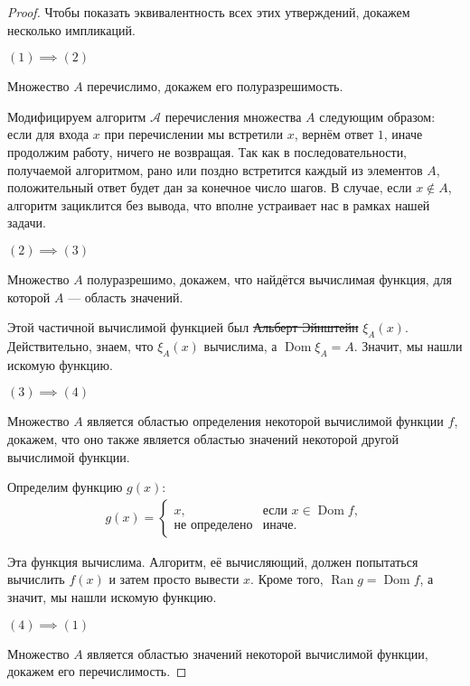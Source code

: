 \documentclass{article}
\begin{document}
    \begin{proof}
        Чтобы показать эквивалентность всех этих утверждений, докажем несколько импликаций.

        $(1) \implies (2)$

        Множество $A$ перечислимо, докажем его полуразрешимость.

        Модифицируем алгоритм $\mathcal{A}$ перечисления множества $A$ следующим образом: если для входа $x$
        при перечислении мы встретили $x$, вернём ответ $1$, иначе продолжим работу, ничего не возвращая.
        Так как в последовательности, получаемой алгоритмом, рано или поздно встретится каждый из
        элементов $A$, положительный ответ будет дан за конечное число шагов. В случае, если $x
        \not\in A$, алгоритм зациклится без вывода, что вполне устраивает нас в рамках нашей задачи.

        $(2) \implies (3)$

        Множество $A$ полуразрешимо, докажем, что найдётся вычислимая функция, для которой $A$ ---
        область значений.

        Этой частичной вычислимой функцией был \sout{Альберт Эйнштейн} $\xi_A(x)$. Действительно,
        знаем, что $\xi_A(x)$ вычислима, а $\operatorname{Dom} \xi_A = A$. Значит, мы
        нашли искомую функцию.

        $(3) \implies (4)$

        Множество $A$ является областью определения некоторой вычислимой функции $f$, докажем, что
        оно также является областью значений некоторой другой вычислимой функции.

        Определим функцию $g(x)$:
        \begin{gather*}
            g(x) =
            \begin{cases}
                x, & \text{если } x \in \operatorname{Dom} f,\\
                \text{не определено} & \text{иначе.}
            \end{cases}
        \end{gather*}

        Эта функция вычислима. Алгоритм, её вычисляющий, должен попытаться вычислить $f(x)$ и затем
        просто вывести $x$. Кроме того, $\operatorname{Ran} g = \operatorname{Dom} f$, а значит, мы
        нашли искомую функцию.

        $(4) \implies (1)$

        Множество $A$ является областью значений некоторой вычислимой функции, докажем его
        перечислимость.


\end{proof}
\end{document}
